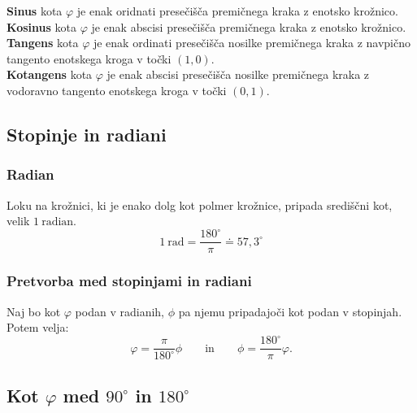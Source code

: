 \begin{multicols}{2}
                    
                    \textbf{Sinus} kota $\varphi$ je enak oridnati presečišča premičnega kraka z enotsko krožnico.
                    \\
                
                    \textbf{Kosinus} kota $\varphi$ je enak abscisi presečišča premičnega kraka z enotsko krožnico.
                    \\

                    \textbf{Tangens} kota $\varphi$ je enak ordinati presečišča nosilke premičnega kraka z navpično tangento enotskega kroga v točki $(1,0)$.
                    \\
                
                    \textbf{Kotangens} kota $\varphi$ je enak abscisi presečišča nosilke premičnega kraka z vodoravno tangento enotskega kroga v točki $(0,1)$.

                
                \end{multicols}

        


        
        
            \subsection*{Stopinje in radiani}
            
            \subsubsection*{Radian}
                Loku na krožnici, ki je enako dolg kot polmer krožnice, pripada središčni kot, velik $1 \ \textrm{radian}$.
                $$ 1 \ \textrm{rad}=\frac{180^\circ}{\pi}\doteq 57,3^\circ$$
            

            \subsubsection*{Pretvorba med stopinjami in radiani}
                Naj bo kot $\varphi$ podan v radianih, $\phi$ pa njemu pripadajoči kot podan v stopinjah. Potem velja:
                $$ \varphi = \frac{\pi}{180^\circ}\phi \quad \quad
                \text{in} \quad \quad 
                 \phi = \frac{180^\circ}{\pi} \varphi.$$
            
        

                \newpage
        
            \subsection*{Kot $\varphi$ med $90^\circ$ in $180^\circ$}

